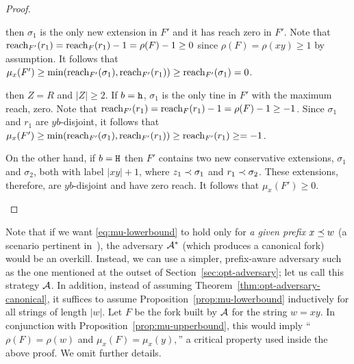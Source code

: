 \begin{proof}
  \begin{description}[font=\normalfont\itshape\space]
    \item[If $\rho(xy) \geq 1$ and $\mu_x(y) = 0$]
      then $\sigma_1$ is the only new extension in $F'$ 
      and it has reach zero in $F'$.
      Note that 
      $\operatorname{reach}_{F'}(r_1) = \operatorname{reach}_F(r_1) - 1 = \rho(F) - 1 \geq 0$ 
      since $\rho(F) = \rho(xy) \geq 1$ by assumption. 
      It follows that $\mu_x(F') \geq \min(\operatorname{reach}_{F'}(\sigma_1), \operatorname{reach}_{F'}(r_1) ) \geq \operatorname{reach}_{F'}(\sigma_1) = 0$. 




    \item[If $\rho(xy) = 0$ and $\mu_x(y) = 0$] 
      then $Z = R$ and $|Z| \geq 2$. 
      If $b = \mathtt{h}$, 
      $\sigma_1$
      is the only tine in $F'$ with the maximum reach, zero. 
      Note that 
      $\operatorname{reach}_{F'}(r_1) = \operatorname{reach}_F(r_1) - 1 = \rho(F) - 1 \geq -1$. 
      Since $\sigma_1$ and $r_1$ are $yb$-disjoint, 
      it follows that 
      $\mu_x(F') \geq \min(\operatorname{reach}_{F'}(\sigma_1), \operatorname{reach}_{F'}(r_1) ) 
      \geq \operatorname{reach}_{F'}(r_1) \geq = -1$.

      On the other hand, if $b = \mathtt{H}$ then 
      $F'$ contains two new conservative extensions, 
      $\sigma_1$ and $\sigma_2$, 
      both with label $|xy| + 1$, 
      where $z_1 \prec \sigma_1$ and $r_1 \prec \sigma_2$.  
      These extensions, therefore, are $yb$-disjoint 
      and have zero reach.
      It follows that $\mu_x(F') \geq 0$.
  \end{description}
\end{proof}


Note that 
if we want \eqref{eq:mu-lowerbound} 
to hold only for \emph{a given prefix} $x \preceq w$ 
(a scenario pertinent in~\cite{LinearConsistencySODA}), 
the adversary $\mathcal{A}^*$ 
(which produces a canonical fork) 
would be an overkill. 
Instead, 
we can use a simpler, prefix-aware adversary 
such as the one mentioned 
at the outset of Section~\ref{sec:opt-adversary}; 
let us call this strategy $\mathcal{A}$. 
In addition, 
instead of assuming Theorem~\ref{thm:opt-adversary-canonical}, 
it suffices to assume 
Proposition~\ref{prop:mu-lowerbound} inductively 
for all strings of length $|w|$. 
Let $F$ be the fork 
built by $\mathcal{A}$ for the string $w = xy$.
In conjunction with Proposition~\ref{prop:mu-upperbound}, 
this would imply ``$\rho(F) = \rho(w)$ and 
$\mu_x(F) = \mu_x(y),$'' 
a critical property used inside the above proof. 
We omit further details.



